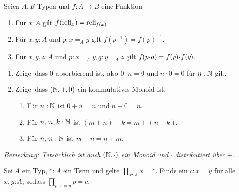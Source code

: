 \documentclass{uebung}
\begin{document}

\begin{exercise}
  Seien $A,B$ Typen und $f:A\to B$ eine Funktion.
  \begin{enumerate}
    \item Für $x:A$ gilt $f(\mathrm{refl}_x)=\mathrm{refl}_{f(x)}$.
    \item Für $x,y:A$ und $p:x=_A y$ gilt $f(p^{-1})=f(p)^{-1}$.
    \item Für $x,y,z:A$ und $p:x=_A y, q:y=_A z$ gilt $f(p\kon q)=f(p)\kon f(q)$.
  \end{enumerate}
\end{exercise}

\begin{exercise}
  \begin{enumerate}
    \item Zeige, dass $0$ absorbierend ist, also $0 \cdot n = 0$ und $n \cdot 0 = 0$ für $n:\mathbb{N}$ gilt.
    \item Zeige, dass $(\mathbb{N},+,0)$ ein kommutatives Monoid ist:
      \begin{enumerate}
        \item Für $n:\mathbb{N}$ ist $0 + n = n$ und $n + 0 = n$.
        \item Für $n,m,k:\mathbb{N}$ ist $(m + n) + k = m + (n + k)$.
        \item Für $n,m:\mathbb{N}$ ist $m + n = n + m$.
      \end{enumerate}
    \end{enumerate}
    \emph{Bemerkung: Tatsächlich ist auch $(\mathbb{N},\cdot)$ ein Monoid und $\cdot$ distributiert über $+$.}
\end{exercise}

\begin{exercise}
  Sei $A$ ein Typ, $\ast:A$ ein Term und gelte $\prod_{x:A}x=\ast$.
  Finde ein $c:x=y$ für alle $x,y:A$, sodass $\prod_{p:x=y}p=c$.
\end{exercise}
\end{document}
